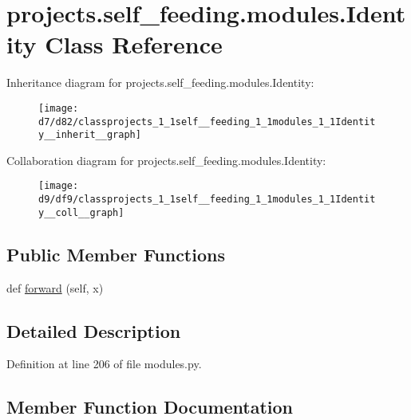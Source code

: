 \hypertarget{classprojects_1_1self__feeding_1_1modules_1_1Identity}{}\section{projects.\+self\+\_\+feeding.\+modules.\+Identity Class Reference}
\label{classprojects_1_1self__feeding_1_1modules_1_1Identity}


Inheritance diagram for projects.\+self\+\_\+feeding.\+modules.\+Identity\+:\nopagebreak
\begin{figure}[H]
\begin{center}
\leavevmode
\texttt{[image: d7/d82/classprojects\_1\_1self\_\_feeding\_1\_1modules\_1\_1Identity\_\_inherit\_\_graph]}
\end{center}
\end{figure}


Collaboration diagram for projects.\+self\+\_\+feeding.\+modules.\+Identity\+:\nopagebreak
\begin{figure}[H]
\begin{center}
\leavevmode
\texttt{[image: d9/df9/classprojects\_1\_1self\_\_feeding\_1\_1modules\_1\_1Identity\_\_coll\_\_graph]}
\end{center}
\end{figure}
\subsection*{Public Member Functions}
\begin{DoxyCompactItemize}
\item 
def \hyperlink{classprojects_1_1self__feeding_1_1modules_1_1Identity_a1979c4302e23f874290c2a0bc0688edf}{forward} (self, x)
\end{DoxyCompactItemize}


\subsection{Detailed Description}


Definition at line 206 of file modules.\+py.



\subsection{Member Function Documentation}
\mbox{\label{classprojects_1_1self__feeding_1_1modules_1_1Identity_a1979c4302e23f874290c2a0bc0688edf}} 
